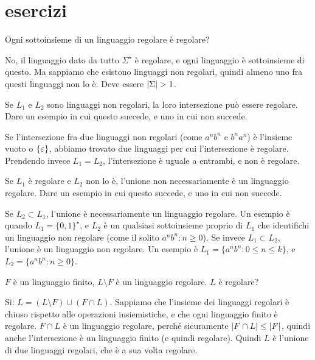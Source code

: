 
\chapter{esercizi}

\begin{esercizio}
Ogni sottoinsieme di un linguaggio regolare \`e regolare?
\end{esercizio}

No, il linguaggio dato da tutto $\Sigma^{\star}$ \`e regolare, e ogni linguaggio \`e sottoinsieme di questo.
Ma sappiamo che esistono linguaggi non regolari, quindi almeno uno fra questi linguaggi non lo \`e.
Deve essere $\left\lvert{\Sigma}\right\rvert > 1$.

\begin{esercizio}
Se $L_1$ e $L_2$ sono linguaggi non regolari, la loro intersezione pu\`o essere regolare.
Dare un esempio in cui questo succede, e uno in cui non succede.
\end{esercizio}

Se l'intersezione fra due linguaggi non regolari (come $a^nb^n$ e $b^na^n$) \`e l'insieme vuoto o $\{\varepsilon\}$, abbiamo trovato due linguaggi per cui l'intersezione \`e regolare.
Prendendo invece $L_1 = L_2$, l'intersezione \`e uguale a entrambi, e non \`e regolare.

\begin{esercizio}
Se $L_1$ \`e regolare e $L_2$ non lo \`e, l'unione non necessariamente \`e un linguaggio regolare.
Dare un esempio in cui questo succede, e uno in cui non succede.
\end{esercizio}

Se $L_2 \subset L_1$, l'unione \`e necessariamente un linguaggio regolare.
Un esempio \`e quando $L_1 = \{0,1\}^{\star}$, e $L_2$ \`e un qualsiasi sottoinsieme proprio di $L_1$ che identifichi un linguaggio non regolare (come il solito $a^n b^n : n \ge 0$).
Se invece $L_1 \subset L_2$, l'unione \`e un linguaggio non regolare.
Un esempio \`e $L_1 = \{ a^n b^n : 0 \le n \le k \}$, e $L_2 = \{ a^n b^n : n \ge 0 \}$.

\begin{esercizio}
$F$ \`e un linguaggio finito, $L \setminus F$ \`e un linguaggio regolare. $L$ \`e regolare?
\end{esercizio}

S\`i: $L = (L \setminus F) \cup (F \cap L)$.
Sappiamo che l'insieme dei linguaggi regolari \`e chiuso rispetto alle operazioni insiemistiche, e che ogni linguaggio finito \`e regolare.
$F \cap L$ \`e un linguaggio regolare, perch\'e sicuramente $\left\lvert{F \cap L}\right\rvert \le \left\lvert{F}\right\rvert$,   quindi anche l'intersezione \`e un linguaggio finito (e quindi regolare).
Quindi $L$ \`e l'unione di due linguaggi regolari, che \`e a sua volta regolare.

